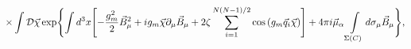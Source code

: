 \begin{equation}
\label{WWW}
\times\int {\cal D}\vec\chi
\exp\Biggl\{\int d^3x\Biggl[-\frac{g_m^2}{2}\vec B_\mu^2+
ig_m\vec\chi\partial_\mu\vec B_\mu+
2\zeta
\sum\limits_{i=1}^{N(N-1)/2}
\cos\left(g_m\vec q_i\vec\chi\right)\Biggr]+
4\pi i\vec\mu_\alpha\int\limits_{\Sigma(C)}^{}d\sigma_\mu\vec B_\mu\Biggr\},
\end{equation}

